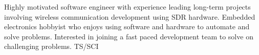 

\begin{cvparagraph}

Highly motivated software engineer with experience leading long-term projects involving wireless communication development using SDR hardware.  Embedded electronics hobbyist who enjoys using software and hardware to automate and solve problems.  Interested in joining a fast paced development team to solve on challenging problems.  TS/SCI
\end{cvparagraph}
